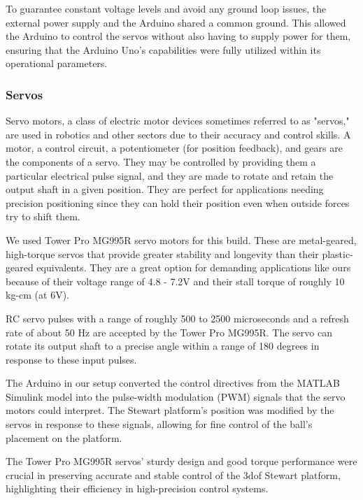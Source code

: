 To guarantee constant voltage levels and avoid any ground loop issues, the external power supply and the Arduino shared a common ground. This allowed the Arduino to control the servos without also having to supply power for them, ensuring that the Arduino Uno's capabilities were fully utilized within its operational parameters.


\subsubsection{Servos}%

Servo motors, a class of electric motor devices sometimes referred to as "servos," are used in robotics and other sectors due to their accuracy and control skills. A motor, a control circuit, a potentiometer (for position feedback), and gears are the components of a servo. They may be controlled by providing them a particular electrical pulse signal, and they are made to rotate and retain the output shaft in a given position. They are perfect for applications needing precision positioning since they can hold their position even when outside forces try to shift them.\newline

We used Tower Pro MG995R servo motors for this build. These are metal-geared, high-torque servos that provide greater stability and longevity than their plastic-geared equivalents. They are a great option for demanding applications like ours because of their voltage range of 4.8 - 7.2V and their stall torque of roughly 10 kg-cm (at 6V)\cite{tower_pro_mg995_nodate}.\newline

RC servo pulses with a range of roughly 500 to 2500 microseconds and a refresh rate of about 50 Hz are accepted by the Tower Pro MG995R. The servo can rotate its output shaft to a precise angle within a range of 180 degrees in response to these input pulses.\newline

The Arduino in our setup converted the control directives from the MATLAB Simulink model into the pulse-width modulation (PWM) signals that the servo motors could interpret. The Stewart platform's position was modified by the servos in response to these signals, allowing for fine control of the ball's placement on the platform.\newline

The Tower Pro MG995R servos' sturdy design and good torque performance were crucial in preserving accurate and stable control of the 3dof Stewart platform, highlighting their efficiency in high-precision control systems.

